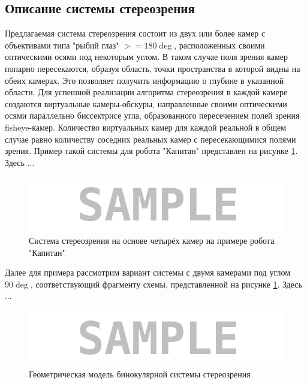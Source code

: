 \subsection{Описание системы стереозрения}

Предлагаемая система стереозрения состоит из двух или более камер с объективами типа "рыбий глаз" $>=180\deg$,
расположенных своими оптическими осями под некоторым углом. В таком случае поля зрения камер попарно пересекаются, 
образуя  область, точки пространства в которой видны на обеих камерах. Это позволяет получить информацию о 
глубине в указанной области.
Для успешной реализации алгоритма стереозрения в каждой камере создаются виртуальные камеры-обскуры, направленные 
своими оптическими осями параллельно биссектрисе угла, образованного пересечением полей зрения fisheye-камер. Количество
 виртуальных камер для каждой реальной в общем случае равно количеству соседних реальных камер с пересекающимися полями 
 зрения. Пример такой системы для робота "Капитан" представлен на рисунке \ref{pic:4cam_system}. Здесь ... %
 \begin{figure}[H]
    \begin{center}
        \includegraphics[scale=0.5]{pics/sample.png}                                                                                            %
        \caption{Система стереозрения на основе четырёх камер на примере робота "Капитан"}
        \label{pic:4cam_system}
    \end{center}
\end{figure}
 Далее для примера рассмотрим вариант системы с двумя камерами под углом $90\deg$, соответствующий фрагменту схемы,
  представленной на рисунке \ref{pic:4cam_system}. Здесь ... %
\begin{figure}[H]
    \begin{center}
        \includegraphics[scale=0.5]{pics/sample.png}                                                                                            %
        \caption{Геометрическая модель бинокулярной системы стереозрения}
        \label{pic:2cam_scheme}
    \end{center}
\end{figure}
